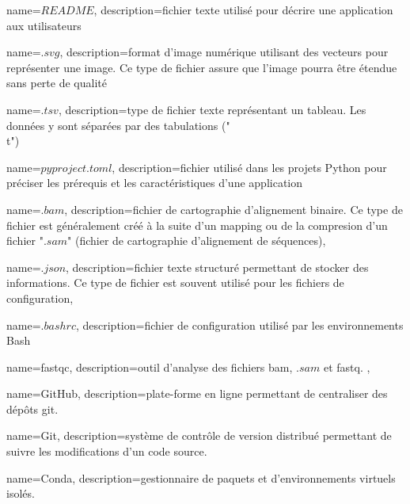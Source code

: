  {
    name=$README$,
    description={fichier texte utilisé pour décrire une application aux utilisateurs}
}
\newcommand{\readme}{\gls{readme}}


 {
   name=$.svg$,
    description={format d'image numérique utilisant des vecteurs pour représenter une image. Ce type de fichier assure que l'image pourra être étendue sans perte de qualité }
}
\newcommand{\svg}{"\gls{svg}"}

 {
   name=$.tsv$,
    description={type de fichier texte représentant un tableau. Les données y sont séparées par des tabulations ("\\t")}
}
\newcommand{\tsv}{"\gls{tsv}"}

 {
   name=$pyproject.toml$,
    description={fichier utilisé dans les projets \gls{Python} pour préciser les prérequis et les caractéristiques d'une application}
}

 {
    name=$.bam$,
    description={fichier de cartographie d'alignement binaire. Ce type de fichier est généralement créé à la suite d'un \gls{mapping} ou de la compresion d'un fichier "$.sam$" (fichier de cartographie d'alignement de séquences)},
}
\newcommand{\bam}{"\gls{bam}"}

 {
    name=$.json$,
    description={fichier texte structuré permettant de stocker des informations. Ce type de fichier est souvent utilisé pour les fichiers de configuration},
}
\newcommand{\json}{"\gls{json}"}

 {
    name=$.bashrc$,
    description={fichier de configuration utilisé par les environnements \gls{Bash}}
}

 {
    name=fastqc,
    description={outil d'analyse des fichiers \gls{bam}, $.sam$ et \gls{fastq}. \cite{fastqc}},
}
\newcommand{\fastqc}{\gls{fastqc}}

 {
    name=GitHub,
    description={plate-forme en ligne permettant de centraliser des dépôts \gls{git}. \cite{github}}
}
\newcommand{\GitHub}{\gls{GitHub}}

 {
    name=Git,
    description={système de contrôle de version distribué permettant de suivre les modifications d'un code source. \cite{git}}
}

 {
    name=Conda,
    description={gestionnaire de paquets et d'environnements virtuels isolés. \cite{conda}}
}
\newcommand{\Conda}{\gls{Conda}}


